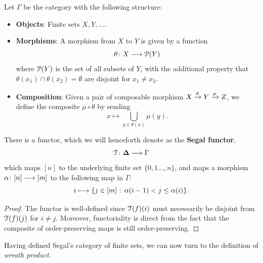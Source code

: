 \begin{definition}
    Let $\Gamma$ be the category with the following structure:\
    \begin{itemize}
        \item \textbf{Objects}: Finite sets $X,Y,\ldots$.
        \item\textbf{Morphisms}: A morphism from $X$ to $Y$ is given by a function 
        \begin{equation}
            \theta \colon X \longrightarrow \mathcal P(Y)
        \end{equation} 
        where $\mathcal P(Y)$ is the set of all subsets of $Y$, with the additional property that $\theta(x_1) \cap \theta(x_2) = \emptyset$ are disjoint for $x_1\neq x_2$. 
        \item \textbf{Composition}: Given a pair of composable morphism $X\xrightarrow{\theta} Y \xrightarrow{\mu} Z$, we define the composite $\mu \circ \theta$ by sending
        \begin{equation}
            x \longmapsto  \bigcup_{y \in \theta(x)} \mu(y).
        \end{equation} 
    \end{itemize}
\end{definition}
\begin{proposition}
There is a functor, which we will henceforth denote as the \textbf{Segal functor},
\begin{equation}
\mathcal T \colon \mathbf\Delta \longrightarrow \Gamma    
\end{equation}
which maps $[n]$ to the underlying finite set $\{0,1\ldots,n\}$, and maps a morphism $\alpha\colon [n] \longrightarrow [m]$ to the following map in $\Gamma$:
\begin{equation}
    i \longmapsto \{j \in [m]\mkern1mu : \, \alpha(i-1) < j \leq \alpha(i)\}.
\end{equation}
\end{proposition}
\begin{proof}
    The functor is well-defined since $\mathcal T(f)(i)$ must necessarily be disjoint from $\mathcal T(f)(j)$ for $i\neq j$. Moreover, functoriality is direct from the fact that the composite of order-preserving maps is still order-preserving.
\end{proof}
Having defined Segal's category of finite sets, we can now turn to the definition of \emph{wreath product}. 

